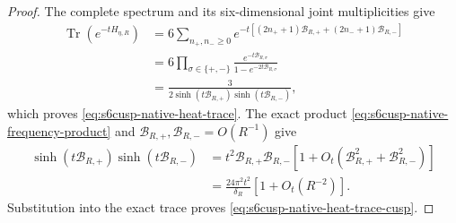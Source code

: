 \begin{proof}
The complete spectrum and its six-dimensional joint multiplicities give
\begin{align*}
 \operatorname{Tr}(e^{-tH_{\eta,R}})
 &=6\sum_{n_+,n_-\ge0}
 e^{-t[(2n_++1)\mathcal B_{R,+}
       +(2n_-+1)\mathcal B_{R,-}]}\\
 &=6\prod_{\sigma\in\{+,-\}}
 \frac{e^{-t\mathcal B_{R,\sigma}}}
 {1-e^{-2t\mathcal B_{R,\sigma}}}\\
 &=\frac{3}{2\sinh(t\mathcal B_{R,+})
                  \sinh(t\mathcal B_{R,-})},
\end{align*}
which proves \eqref{eq:s6cusp-native-heat-trace}.  The exact product
\eqref{eq:s6cusp-native-frequency-product} and
\(\mathcal B_{R,+},\mathcal B_{R,-}=O(R^{-1})\) give
\begin{align*}
 \sinh(t\mathcal B_{R,+})
 \sinh(t\mathcal B_{R,-})
 &=t^2\mathcal B_{R,+}\mathcal B_{R,-}
 \left[1+O_t(\mathcal B_{R,+}^2+
                  \mathcal B_{R,-}^2)\right]\\
 &=\frac{24\pi^2t^2}{\delta_R}
 \left[1+O_t(R^{-2})\right].
\end{align*}
Substitution into the exact trace proves
\eqref{eq:s6cusp-native-heat-trace-cusp}.
\end{proof}


